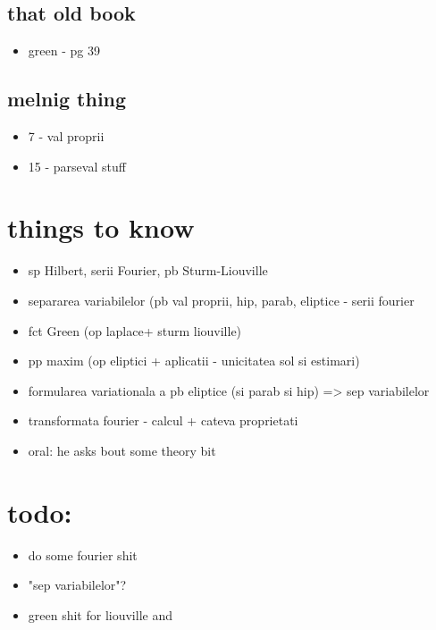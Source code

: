 \documentclass[11pt]{article}
\begin{document}
\subsection*{that old book}
\label{sec:org6d34e2c}
\begin{itemize}
\item green - pg 39
\end{itemize}
\subsection*{melnig thing}
\label{sec:orgc1a7f8b}
\begin{itemize}
\item 7 - val proprii
\item 15 - parseval stuff
\end{itemize}

\section*{things to know}
\label{sec:org3c531bc}
\begin{itemize}
\item sp Hilbert, serii Fourier, pb Sturm-Liouville
\item separarea variabilelor (pb val proprii, hip, parab, eliptice - serii fourier
\item fct Green (op laplace+ sturm liouville)
\item pp maxim (op eliptici + aplicatii - unicitatea sol si estimari)
\item formularea variationala a pb eliptice (si parab si hip) => sep variabilelor
\item transformata fourier - calcul + cateva proprietati

\item oral: he asks bout some theory bit
\end{itemize}

\section*{todo:}
\label{sec:org49d2146}
\begin{itemize}
\item do some fourier shit
\item "sep variabilelor"?
\item green shit for liouville and
\end{itemize}
\end{document}
